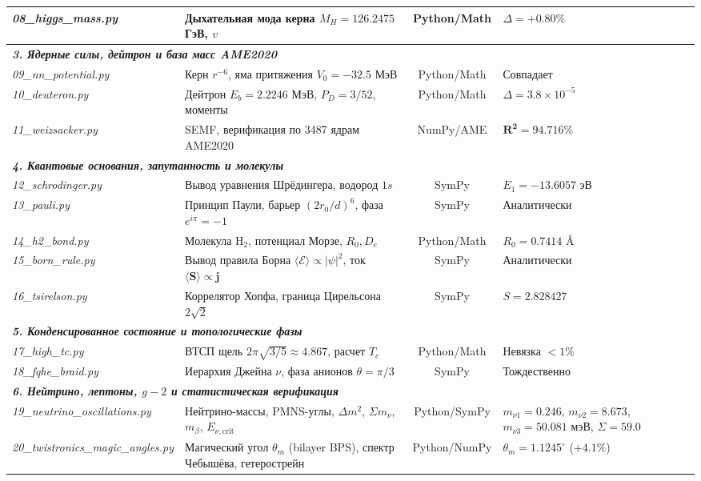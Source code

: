 \documentclass[11pt,a4paper]{article}
\theoremstyle{definition}
\theoremstyle{remark}
\begin{document}
\begin{table}[H]
\begin{tabularx}{\textwidth}{l p{5.5cm} c >{\raggedleft\arraybackslash}X}
\textit{08\_higgs\_mass.py} & Дыхательная мода керна $M_H = 126.2475$ ГэВ, $v$ & Python/Math & $\Delta = +0.80\%$ \\
\midrule
\multicolumn{4}{l}{\textit{\textbf{3. Ядерные силы, дейтрон и база масс AME2020}}} \\
\textit{09\_nn\_potential.py} & Керн $r^{-6}$, яма притяжения $V_0 = -32.5$ МэВ & Python/Math & Совпадает \\
\textit{10\_deuteron.py} & Дейтрон $E_b = 2.2246$ МэВ, $P_D = 3/52$, моменты & Python/Math & $\Delta = 3.8 \times 10^{-5}$ \\
\textit{11\_weizsacker.py} & SEMF, верификация по 3487 ядрам AME2020 & NumPy/AME & $\mathbf{R^2 = 94.716\%}$ \\
\midrule
\multicolumn{4}{l}{\textit{\textbf{4. Квантовые основания, запутанность и молекулы}}} \\
\textit{12\_schrodinger.py} & Вывод уравнения Шрёдингера, водород $1s$ & SymPy & $E_1 = -13.6057\text{ эВ}$ \\
\textit{13\_pauli.py} & Принцип Паули, барьер $(2r_0/d)^6$, фаза $e^{i\pi}=-1$ & SymPy & Аналитически \\
\textit{14\_h2\_bond.py} & Молекула $\mathrm{H}_2$, потенциал Морзе, $R_0, D_e$ & Python/Math & $R_0 = 0.7414\text{ \AA}$ \\
\textit{15\_born\_rule.py} & Вывод правила Борна $\langle\mathcal{E}\rangle \propto |\psi|^2$, ток $\langle\mathbf{S}\rangle \propto \mathbf{j}$ & SymPy & Аналитически \\
\textit{16\_tsirelson.py} & Коррелятор Хопфа, граница Цирельсона $2\sqrt{2}$ & SymPy & $S = 2.828427$ \\
\midrule
\multicolumn{4}{l}{\textit{\textbf{5. Конденсированное состояние и топологические фазы}}} \\
\textit{17\_high\_tc.py} & ВТСП щель $2\pi\sqrt{3/5} \approx 4.867$, расчет $T_c$ & Python/Math & Невязка $< 1\%$ \\
\textit{18\_fqhe\_braid.py} & Иерархия Джейна $\nu$, фаза анионов $\theta = \pi/3$ & SymPy & Тождественно \\
\midrule
\multicolumn{4}{l}{\textit{\textbf{6. Нейтрино, лептоны, $g-2$ и статистическая верификация}}} \\
\textit{19\_neutrino\_oscillations.py} & Нейтрино-массы, PMNS-углы, $\Delta m^2$, $\Sigma m_\nu$, $m_\beta$, $E_{\nu,\mathrm{crit}}$ & Python/SymPy & $m_{\nu1}=0.246$, $m_{\nu2}=8.673$, $m_{\nu3}=50.081$ мэВ, $\Sigma=59.0$ \\
\textit{20\_twistronics\_magic\_angles.py} & Магический угол $\theta_m$ (bilayer BPS), спектр Чебышёва, гетерострейн & Python/NumPy & $\theta_m=1.1245^\circ$ ($+4.1\%$) \\

\end{tabularx}
\end{table}
\end{document}
